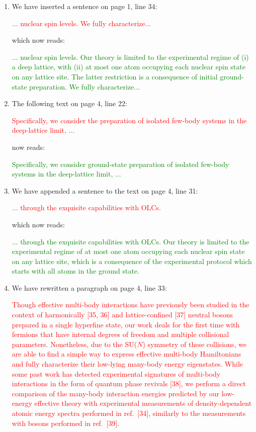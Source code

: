 \documentclass[preprint]{revtex4-1}
\newcommand{\1}{\mathds{1}}
\newcommand{\red}[1]{\textcolor{red}{#1}}
\newcommand{\green}[1]{\textcolor{green}{#1}}
\newcounter{point}
\newcommand{\step}{\stepcounter{point}\setcounter{enumi}{0}}
\begin{document}
\setcounter{point}{1}
\begin{enumerate}[label=(R1.\arabic{point}.\arabic*)]

  \step
\item We have inserted a sentence on page 1, line 34:

  \red{... nuclear spin levels.  We fully characterize...}

  which now reads:

  \green{... nuclear spin levels.  Our theory is limited to the
    experimental regime of (i) a deep lattice, with (ii) at most one
    atom occupying each nuclear spin state on any lattice site.  The
    latter restriction is a consequence of initial ground-state
    preparation.  We fully characterize...}


\item The following text on page 4, line 22:

  \red{Specifically, we consider the preparation of isolated few-body
    systems in the deep-lattice limit, ...}

  now reads:

  \green{Specifically, we consider ground-state preparation of
    isolated few-body systems in the deep-lattice limit, ...}


\item We have appended a sentence to the text on page 4, line 31:

  \red{... through the exquisite capabilities with OLCs.}

  which now reads:

  \green{... through the exquisite capabilities with OLCs.  Our theory
    is limited to the experimental regime of at most one atom
    occupying each nuclear spin state on any lattice site, which is a
    consequence of the experimental protocol which starts with all
    atoms in the ground state.}


\item We have rewritten a paragraph on page 4, line 33:

  \red{Though effective multi-body interactions have previously been
    studied in the context of harmonically [35, 36] and
    lattice-confined [37] neutral bosons prepared in a single
    hyperfine state, our work deals for the first time with fermions
    that have internal degrees of freedom and multiple collisional
    parameters.  Nonetheless, due to the SU($N$) symmetry of these
    collisions, we are able to find a simple way to express effective
    multi-body Hamiltonians and fully characterize their low-lying
    many-body energy eigenstates.  While some past work has detected
    experimental signatures of multi-body interactions in the form of
    quantum phase revivals [38], we perform a direct comparison of the
    many-body interaction energies predicted by our low-energy
    effective theory with experimental measurements of
    density-dependent atomic energy spectra performed in ref.~[34],
    similarly to the measurements with bosons performed in ref.~[39].}


\end{enumerate}
\end{document}

